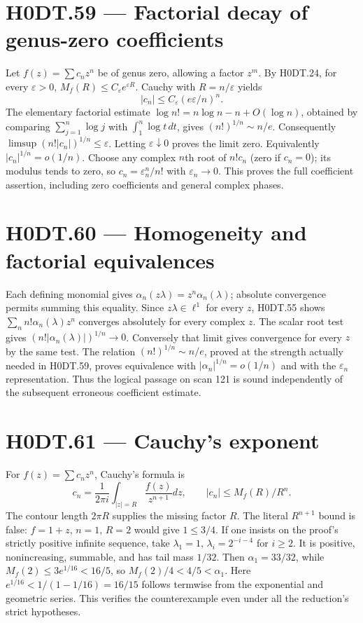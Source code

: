 \section*{H0DT.59 --- Factorial decay of genus-zero coefficients}
Let $f(z)=\sum c_nz^n$ be of genus zero, allowing a factor $z^m$. By H0DT.24, for every $\varepsilon>0$, $M_f(R)\le C_\varepsilon e^{\varepsilon R}$. Cauchy with $R=n/\varepsilon$ yields
\[
 |c_n|\le C_\varepsilon(e\varepsilon/n)^n.
\]
The elementary factorial estimate $\log n!=n\log n-n+O(\log n)$, obtained by comparing $\sum_{j=1}^n\log j$ with $\int_1^n\log t\,dt$, gives $(n!)^{1/n}\sim n/e$. Consequently
$\limsup(n!|c_n|)^{1/n}\le\varepsilon$. Letting $\varepsilon\downarrow0$ proves the limit zero. Equivalently $|c_n|^{1/n}=o(1/n)$. Choose any complex $n$th root of $n!c_n$ (zero if $c_n=0$); its modulus tends to zero, so $c_n=\varepsilon_n^n/n!$ with $\varepsilon_n\to0$. This proves the full coefficient assertion, including zero coefficients and general complex phases.

\section*{H0DT.60 --- Homogeneity and factorial equivalences}
Each defining monomial gives $\alpha_n(z\lambda)=z^n\alpha_n(\lambda)$; absolute convergence permits summing this equality. Since $z\lambda\in\ell^1$ for every $z$, H0DT.55 shows $\sum_n n!\alpha_n(\lambda)z^n$ converges absolutely for every complex $z$. The scalar root test gives $(n!|\alpha_n(\lambda)|)^{1/n}\to0$. Conversely that limit gives convergence for every $z$ by the same test. The relation $(n!)^{1/n}\sim n/e$, proved at the strength actually needed in H0DT.59, proves equivalence with $|\alpha_n|^{1/n}=o(1/n)$ and with the $\varepsilon_n$ representation. Thus the logical passage on scan 121 is sound independently of the subsequent erroneous coefficient estimate.

\section*{H0DT.61 --- Cauchy's exponent}
For $f(z)=\sum c_nz^n$, Cauchy's formula is
\[
 c_n=\frac1{2\pi i}\int_{|z|=R}\frac{f(z)}{z^{n+1}}dz,
 \qquad |c_n|\le M_f(R)/R^n.
\]
The contour length $2\pi R$ supplies the missing factor $R$. The literal $R^{n+1}$ bound is false: $f=1+z$, $n=1$, $R=2$ would give $1\le3/4$. If one insists on the proof's strictly positive infinite sequence, take $\lambda_1=1$, $\lambda_i=2^{-i-4}$ for $i\ge2$. It is positive, nonincreasing, summable, and has tail mass $1/32$. Then $\alpha_1=33/32$, while $M_f(2)\le3e^{1/16}<16/5$, so $M_f(2)/4<4/5<\alpha_1$. Here $e^{1/16}<1/(1-1/16)=16/15$ follows termwise from the exponential and geometric series. This verifies the counterexample even under all the reduction's strict hypotheses.

